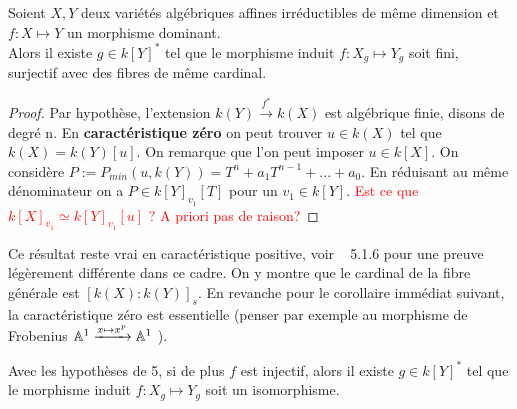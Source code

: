 \begin{prop}Soient $X,Y$ deux variétés algébriques affines irréductibles de même dimension et $f:X \mapsto Y$ un morphisme dominant.\\
Alors il existe $g\in k[Y]^*$ tel que le morphisme induit $f:X_g \mapsto Y_g$ soit fini, surjectif avec des fibres de même cardinal.
\end{prop}
\begin{proof}
Par hypothèse, l'extension $k(Y) \xrightarrow{f^*} k(X)$ est algébrique finie, disons de degré n. En \textbf{caractéristique zéro} on peut trouver $u\in k(X)$ tel que $k(X)=k(Y)[u]$. On remarque que l'on peut imposer $u\in k[X]$. On considère $P:=P_{min}(u, k(Y))=T^n+a_1T^{n-1}+...+a_0$. En réduisant au même dénominateur on a $P\in k[Y]_{v_1}[T]$ pour un $v_1\in k[Y]$. \textcolor{red}{Est ce que $k[X]_{v_1}\simeq k[Y]_{v_1}[u]$ ? A priori pas de raison?}
\end{proof}

Ce résultat reste vrai en caractéristique positive, voir 
~\cite{LAGSpringer} 5.1.6 pour une preuve légèrement différente dans ce cadre. On y montre que le cardinal de la fibre générale est $[k(X):k(Y)]_s$. En revanche pour le corollaire immédiat suivant, la caractéristique zéro est essentielle (penser par exemple au morphisme de Frobenius $\mathbb{A}^1 \xrightarrow{x \mapsto x^p} \mathbb{A}^1$ ). 
\begin{cor}
Avec les hypothèses de 5, si de plus $f$ est injectif, alors il existe $g\in k[Y]^*$ tel que le morphisme induit $f:X_g \mapsto Y_g$ soit un isomorphisme.
\end{cor}

